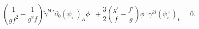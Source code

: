 \begin{equation}
(\frac{1}{gf^2}-\frac{1}{g^2f})\tilde \gamma^{k0i}\partial_0(\psi^-_i)_R\phi^-+ \frac{3}{2}(\frac{g'}{f}-\frac{f'}{g})\phi^+\gamma^{ki}(\psi^+_i)_L
=0.
\end{equation}

